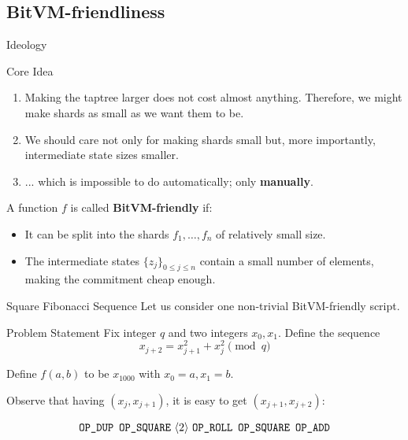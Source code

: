 \documentclass{zkdl-presentation-template}
\newcommand{\elem}[1]{\, \langle #1 \rangle \,}
\newcommand{\opcode}[1]{\, \texttt{#1} \,}
\begin{document}
    \subsection{BitVM-friendliness}
    \begin{frame}{Ideology}
        \begin{block}{Core Idea}
            \begin{enumerate}
                \item Making the taptree larger does not cost almost anything. Therefore, we might make shards as small as we want them to be.\pause
                \item We should care not only for making shards small but, more importantly, intermediate state sizes smaller.\pause
                \item ... which is impossible to do automatically; only \textbf{manually}.\pause
            \end{enumerate}
        \end{block}

        \begin{definition}
          A function $f$ is called \textbf{BitVM-friendly} if:
          \begin{itemize}
            \item It can be split into the shards $f_1,\dots,f_n$ of relatively small size.\pause
            \item The intermediate states $\{z_j\}_{0 \leq j \leq n}$ contain a small number of elements, making the commitment cheap enough.
          \end{itemize}
        \end{definition}
    \end{frame}

    \begin{frame}{Square Fibonacci Sequence}
        Let us consider one non-trivial BitVM-friendly script.\pause
    
        \begin{block}{Problem Statement}
            Fix integer $q$ and two integers $x_0,x_1$. Define the sequence
            \begin{equation*}
                x_{j+2} = x_{j+1}^2 + x_j^2 \pmod{q}
            \end{equation*}

            \pause Define $f(a,b)$ to be $x_{1000}$ with $x_0 = a, x_1=b$. \pause
        \end{block}

        Observe that having $(x_j,x_{j+1})$, it is easy to get $(x_{j+1},x_{j+2})$:\pause
        \begin{empheqboxed}
            \small
          \begin{align*}
            \opcode{\texttt{OP\_DUP}} \, \opcode{\texttt{OP\_SQUARE}} \elem{2} \opcode{\texttt{OP\_ROLL}} \, \opcode{\texttt{OP\_SQUARE}} \, \opcode{\texttt{OP\_ADD}}
          \end{align*}
        \end{empheqboxed}
    \end{frame}
\end{document}
